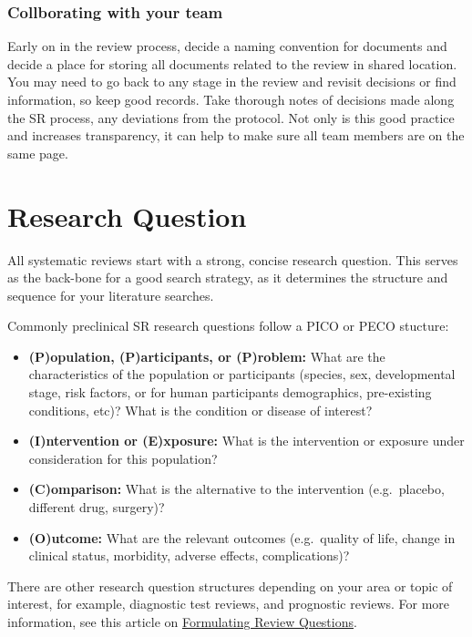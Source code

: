 \documentclass[
]{book}
\providecommand{\tightlist}{%
  \setlength{\itemsep}{0pt}\setlength{\parskip}{0pt}}
\begin{document}
\subsection{Collborating with your team}\label{collborating-with-your-team}

Early on in the review process, decide a naming convention for documents and decide a place for storing all documents related to the review in shared location. You may need to go back to any stage in the review and revisit decisions or find information, so keep good records. Take thorough notes of decisions made along the SR process, any deviations from the protocol. Not only is this good practice and increases transparency, it can help to make sure all team members are on the same page.

\chapter{Research Question}\label{researchquestion}

All systematic reviews start with a strong, concise research question. This serves as the back-bone for a good search strategy, as it determines the structure and sequence for your literature searches.

Commonly preclinical SR research questions follow a PICO or PECO stucture:

\begin{itemize}
\tightlist
\item
  \textbf{(P)opulation, (P)articipants, or (P)roblem:} What are the characteristics of the population or participants (species, sex, developmental stage, risk factors, or for human participants demographics, pre-existing conditions, etc)? What is the condition or disease of interest?
\item
  \textbf{(I)ntervention or (E)xposure:} What is the intervention or exposure under consideration for this population?
\item
  \textbf{(C)omparison:} What is the alternative to the intervention (e.g.~placebo, different drug, surgery)?
\item
  \textbf{(O)utcome:} What are the relevant outcomes (e.g.~quality of life, change in clinical status, morbidity, adverse effects, complications)?
\end{itemize}

There are other research question structures depending on your area or topic of interest, for example, diagnostic test reviews, and prognostic reviews.
For more information, see this article on \href{https://journals.library.ualberta.ca/eblip/index.php/EBLIP/article/view/9741/8144}{Formulating Review Questions}.
\end{document}
